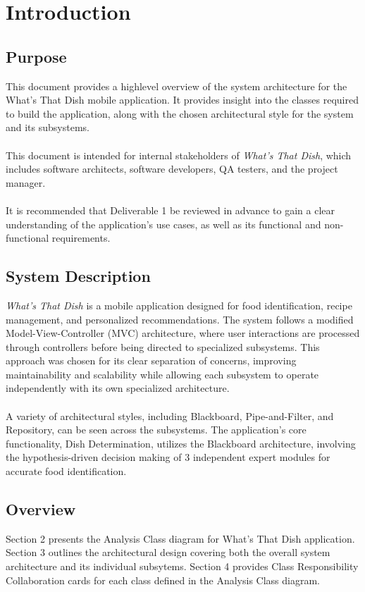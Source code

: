 \documentclass[]{article}
\begin{document}
\newpage
\section{Introduction}
\label{sec:introduction}

\subsection{Purpose}
\label{sub:purpose}
This document provides a highlevel overview of the system architecture for the What’s That Dish mobile application.
It provides insight into the classes required to build the application, along with the chosen architectural style for the system and its subsystems.
\\
\\
This document is intended for internal stakeholders of \textit{What’s That Dish}, which includes software architects, software developers, QA testers, and the project manager.
\\
\\
It is recommended that Deliverable 1 be reviewed in advance to gain a clear understanding of the application’s use cases, as well as its functional and non-functional requirements.

\subsection{System Description}
\label{sub:system_description}
\textit{What’s That Dish} is a mobile application designed for food identification, recipe management, and personalized recommendations. The system follows a modified Model-View-Controller (MVC) architecture, where user interactions are processed through controllers before being directed to specialized subsystems. This approach was chosen for its clear separation of concerns, improving maintainability and scalability while allowing each subsystem to operate independently with its own specialized architecture.
\\
\\
A variety of architectural styles, including Blackboard, Pipe-and-Filter, and Repository, can be seen across the subsystems. The application's core functionality, Dish Determination, utilizes the Blackboard architecture, involving the hypothesis-driven decision making of 3 independent expert modules for accurate food identification.

\subsection{Overview}
\label{sub:overview}
Section 2 presents the Analysis Class diagram for What's That Dish application.
Section 3 outlines the architectural design covering both the overall system architecture and its individual subsytems.
Section 4 provides Class Responsibility Collaboration cards for each class defined in the Analysis Class diagram.
\end{document}
